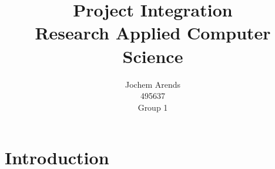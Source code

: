 \documentclass{article}
\title{Project Integration \\ Research Applied Computer Science}
\author{Jochem Arends \\ 495637 \\ Group 1}
\begin{document}
\maketitle
\newpage

\tableofcontents
\newpage

\cite{ESP32:PlatformIO}


\section{Introduction}


\end{document}
